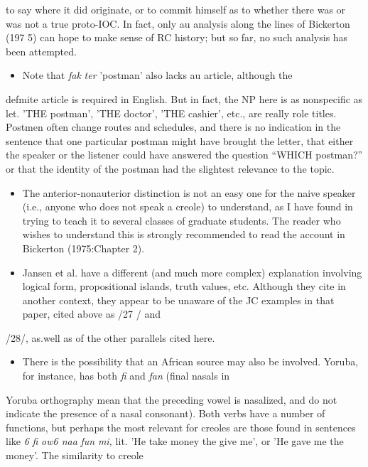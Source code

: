 
to say where it did originate, or to commit himself as to whether there was or was not a true proto-IOC. In fact, only au analysis along the lines of Bickerton (197 5) can hope to make sense of RC history; but so far, no such analysis has been attempted.

\begin{itemize}
\item Note that \textit{fak} \textit{ter} 'postman' also lacks au article, although the
\end{itemize}

defmite article is required in English. But in fact, the NP here is as nonspecific as let. 'THE postman', 'THE doctor', 'THE cashier', etc., are really role titles. Postmen often change routes and schedules, and there is no indication in the sentence that one particular postman might have brought the letter, that either the speaker or the listener could have answered the question ``WHICH postman?'' or that the identity of the postman had the slightest relevance to the topic.

\begin{itemize}
\item The anterior-nonauterior distinction is not an easy one for the naive speaker (i.e., anyone who does not speak a creole) to under\-stand, as I have found in trying to teach it to several classes of graduate students. The reader who wishes to understand this is strongly recom\-mended to read the account in Bickerton (1975:Chapter 2).
\item Jansen et al. have a different (and much more complex) explanation involving logical form, propositional islands, truth values, etc. Although they cite \citet{Roberts1975} in another context, they appear to be unaware of the JC examples in that paper, cited above as /27 / and
\end{itemize}

/28/, as.well as of the other parallels cited here.

\begin{itemize}
\item There is the possibility that an African source may also be involved. Yoruba, for instance, has both \textit{fi} and \textit{fan }(final nasals in
\end{itemize}

Yoruba orthography mean that the preceding vowel is nasalized, and do not indicate the presence of a nasal consonant). Both verbs have a number of functions, but perhaps the most relevant for creoles are those found in sentences like \textit{6} \textit{fi} \textit{ow6 naa} \textit{fun} \textit{mi,} lit. 'He take money the give me', or 'He gave me the money'. The similarity to creole

